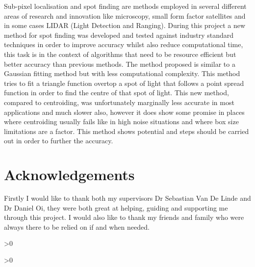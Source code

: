 \documentclass[aps,pra,a4paper,nofootinbib,onecolumn,tightenlines,longbibliography,12pt,amsfonts,amssymb,amsmath,floatfix]{revtex4-2} %
\begin{document}
Sub-pixel localisation and spot finding are methods employed in several different areas of research and innovation
like microscopy, small form factor satellites and in some cases LIDAR (Light Detection and Ranging). During this 
project a new method for spot finding was developed and tested against industry standard techniques in order 
to improve accuracy whilst also reduce computational time, this task is in the context of algorithms that need 
to be resource efficient but better accuracy than previous methods. The method proposed is similar to a Gaussian 
fitting method but with less computational complexity. This method tries to fit a triangle function overtop a spot 
of light that follows a point spread function in order to find the centre of that spot of light. This new method, 
compared to centroiding, was unfortunately marginally less accurate in most applications and much slower also, 
however it does show some promise in places where centroiding usually fails like in high noise situations and 
where box size limitations are a factor. This method shows potential and steps should be carried out 
in order to further the accuracy.

\newpage
\section*{Acknowledgements}

Firstly I would like to thank both my supervisors Dr Sebastian Van De Linde and Dr Daniel Oi, 
they were both great at helping, guiding and supporting me through this project. I would also like 
to thank my friends and family who were always there to be relied on if and when needed. 

\newpage
\tableofcontents %
\makeatletter
\let\toc@pre\relax
\let\toc@post\relax
\makeatother

\ifnum\totalfigures>0
\newpage
\listoffigures
{}
\fi

\ifnum\totaltables>0
\newpage
\listoftables
{}
\fi







\newpage
{}
\end{document}
